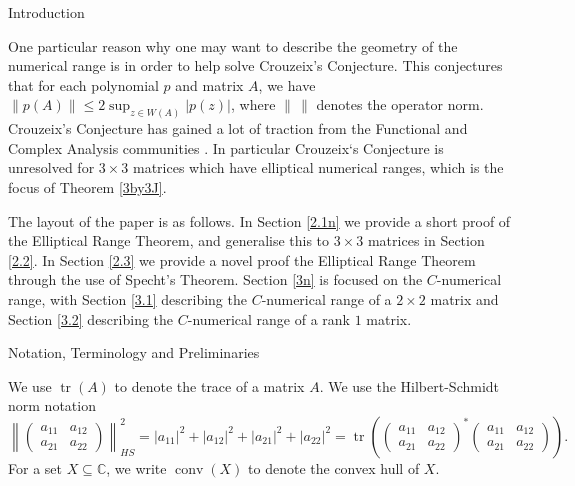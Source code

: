 \documentclass[12pt]{article}
\theoremstyle{plain}
\theoremstyle{definition}
\theoremstyle{remark}
\numberwithin{equation}{section}
\begin{document}
\begin{section}{Introduction}
    
    
One particular reason why one may want to describe the geometry of the numerical range is in order to help solve Crouzeix's Conjecture. This conjectures that for each polynomial $p$ and matrix $A$, we have $\|p(A)\| \leq 2 \sup_{z \in W(A)}|p(z)|$, where $\| \, \|$ denotes the operator norm. Crouzeix's Conjecture has gained a lot of traction from the Functional and Complex Analysis communities \cite{o2024crouzeix, CC11.08, CC2matrix, CC3by3, CCgorkin, CCincreasing, CCLi, CCLi2, CCnilpotent, CCnum, malman2024double}. In particular Crouzeix`s Conjecture is unresolved for $ 3 \times 3$ matrices which have elliptical numerical ranges, which is the focus of Theorem \ref{3by3J}.
    


The layout of the paper is as follows. In Section \ref{2.1n} we provide a short proof of the Elliptical Range Theorem, and generalise this to $3 \times 3$ matrices in Section \ref{2.2}. In Section \ref{2.3} we provide a novel proof the Elliptical Range Theorem through the use of Specht's Theorem. Section \ref{3n} is focused on the $C$-numerical range, with Section \ref{3.1} describing the $C$-numerical range of a $2 \times 2$ matrix and Section \ref{3.2} describing the $C$-numerical range of a rank $1$ matrix.



    
    
\begin{subsection}{Notation, Terminology and Preliminaries}\label{1.1}




We use $\operatorname{tr}(A)$ to denote the trace of a matrix $A$. We use the Hilbert-Schmidt norm notation 
$$
\left\| \begin{pmatrix}
    a_{11} & a_{12} \\
    a_{21} & a_{22} 
\end{pmatrix} \right\|_{HS}^2 = |a_{11}|^2 + |a_{12}|^2 + |a_{21}|^2 + |a_{22}|^2 = \operatorname{tr}\left(\begin{pmatrix}
    a_{11} & a_{12} \\
    a_{21} & a_{22} 
\end{pmatrix}^*\begin{pmatrix}
    a_{11} & a_{12} \\
    a_{21} & a_{22} 
\end{pmatrix}\right).
$$
For a set $X\subseteq \mathbb{C}$, we write $\operatorname{conv}(X)$ to denote the convex hull of $X$.


\end{subsection}
\end{section}
\end{document}
